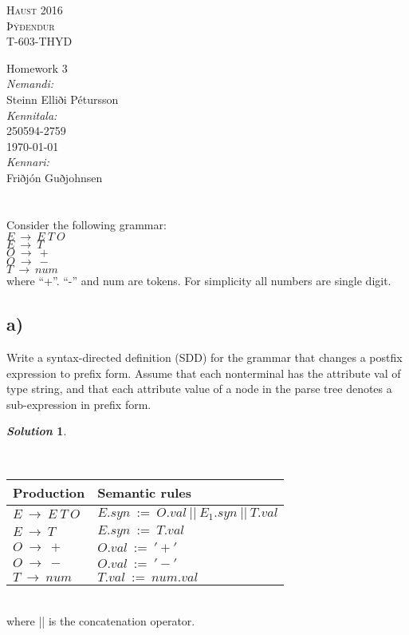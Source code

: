 \documentclass[11pt, a4paper]{article}
\newtheorem*{solution}{\emph{Solution}}
\begin{document}
\begin{titlepage}
\begin{center}

\textsc{\huge Haust 2016}\\[1.5cm]

\textsc{\huge Þýðendur}\\[0.2cm]
\textsc{\huge T-603-THYD}\\[1.5cm]

\end{center}
{ \huge Homework 3\\[1.5cm] }
\Large {
\emph{Nemandi:}\\
Steinn Elliði Pétursson\\[0.5cm]
\emph{Kennitala:}\\
250594-2759\\[0.5cm]
{\large \today}\\[0.5cm]
\emph{Kennari:} \\
Friðjón Guðjohnsen}\\

\end{titlepage}
\leavevmode

\section{}
	Consider the following grammar:\\
		$E~\rightarrow~E~T~O$\\
		$E~\rightarrow~T$\\
		$O~\rightarrow~+$\\
		$O~\rightarrow~-$\\
		$T~\rightarrow~num$\\
	where “+”. “-” and num are tokens. For simplicity all numbers are single digit.\\
	
\subsection*{a)}
	Write a syntax-directed definition (SDD) for the grammar that changes a postfix expression to prefix form. Assume that each nonterminal has the attribute val of type string, and that each attribute value of a node in the parse tree denotes a sub-expression in prefix form.

\begin{solution}\end{solution}~\\
	\begin{tabular}{|l|l|}
	\hline
	\hline
	Production & Semantic rules \\
	\hline
	$E~\rightarrow~E~T~O$ & $E.syn~:=~O.val~||~E_1.syn~||~T.val$\\
	\hline
	$E~\rightarrow~T$ & $E.syn~:=~T.val$\\
	\hline
	$O~\rightarrow~+$ & $O.val~:=~'+'$\\
	\hline
	$O~\rightarrow~-$ & $O.val~:=~'-'$\\
	\hline
	$T~\rightarrow~num$ & $T.val~:=~num.val$\\
	\hline
	\end{tabular}\\
where || is the concatenation operator.
\end{document}
